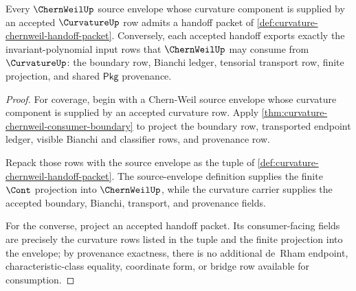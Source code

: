 \begin{theorem}
\label{thm:curvature-handoff-consumer-coverage}
Every $\ChernWeilUp$ source envelope whose curvature component is supplied by an accepted $\CurvatureUp$ row admits a handoff packet of \autoref{def:curvature-chernweil-handoff-packet}. Conversely, each accepted handoff exports exactly the invariant-polynomial input rows that $\ChernWeilUp$ may consume from $\CurvatureUp$: the boundary row, Bianchi ledger, tensorial transport row, finite projection, and shared $\mathsf{Pkg}$ provenance.
\end{theorem}
\begin{proof}
For coverage, begin with a Chern-Weil source envelope whose curvature component is supplied by an accepted curvature row. Apply \autoref{thm:curvature-chernweil-consumer-boundary} to project the boundary row, transported endpoint ledger, visible Bianchi and classifier rows, and provenance row.

Repack those rows with the source envelope as the tuple of \autoref{def:curvature-chernweil-handoff-packet}. The source-envelope definition supplies the finite $\Cont$ projection into $\ChernWeilUp$, while the curvature carrier supplies the accepted boundary, Bianchi, transport, and provenance fields.

For the converse, project an accepted handoff packet. Its consumer-facing fields are precisely the curvature rows listed in the tuple and the finite projection into the envelope; by provenance exactness, there is no additional de~Rham endpoint, characteristic-class equality, coordinate form, or bridge row available for consumption.
\end{proof}

